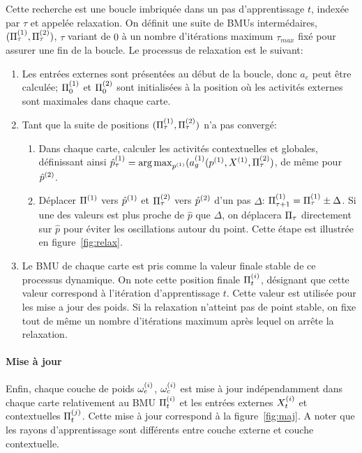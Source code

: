 \documentclass[../main]{subfiles}
\begin{document}
Cette recherche est une boucle imbriquée dans un pas d'apprentissage $t$, indexée par $\tau$ et appelée relaxation. On définit une suite de BMUs intermédaires, $(\Pi^{({1})}_\tau , \Pi^{({2})}_\tau)$, $\tau$ variant de $0$ à un nombre d'itérations maximum $\tau_{max}$ fixé pour assurer une fin de la boucle. Le processus de relaxation est le suivant:
\begin{enumerate}
\item Les entrées externes sont présentées au début de la boucle, donc $a_e$ peut être calculée; $\Pi^{({1})}_0$ et $\Pi^{({2})}_0$ sont initialisées à la position où les activités externes sont maximales dans chaque carte. 
\item Tant que la suite de positions $(\Pi^{({1})}_\tau,\Pi^{({2})}_\tau)$ n'a pas convergé:
	\begin{enumerate}
	\item Dans chaque carte, calculer les activités contextuelles et globales, définissant ainsi $\hat{p}^{({1})}_\tau = \operatorname*{arg\,max}_{p^{({1})}}(a_g^{({1})}(p^{({1})},X^{({1})}, \Pi^{({2})}_\tau)$, de même pour $\hat{p}^{({2})}$.
	\item Déplacer $\Pi^{({1})}$ vers $\hat{p}^{({1})}$ et $\Pi^{({2})}_\tau$ vers $\hat{p}^{({2})}$ d'un pas $\Delta$: $\Pi^{({1})}_{\tau+1} = \Pi^{({1})}_{\tau} \pm \Delta$.
	Si une des valeurs est plus proche de $\hat{p}$ que $\Delta$, on déplacera $\Pi_\tau$ directement sur $\hat{p}$ pour éviter les oscillations autour du point. Cette étape est illustrée en figure~\ref{fig:relax}.
	\end{enumerate}
\item Le BMU de chaque carte est pris comme la valeur finale stable de ce processus dynamique. On note cette position finale $\Pi^{({i})}_t$, désignant que cette valeur correspond à l'itération d'apprentissage $t$. Cette valeur est utilisée pour les mise a jour des poids. Si la relaxation n'atteint pas de point stable, on fixe tout de même un nombre d'itérations maximum après lequel on arrête la relaxation.
\end{enumerate}
\paragraph{Mise à jour}
Enfin, chaque couche de poids $\omega_{e}^{({i})}$, $\omega_c^{({i})}$ est mise à jour indépendamment dans chaque carte relativement au BMU $\Pi^{({i})}_t$ et les entrées externes $X^{({i})}_t$ et contextuelles $\Pi^{({j})}_t$. Cette mise à jour correspond à la figure~\ref{fig:maj}. A noter que les rayons d'apprentissage sont différents entre couche externe et couche contextuelle.
\end{document}
